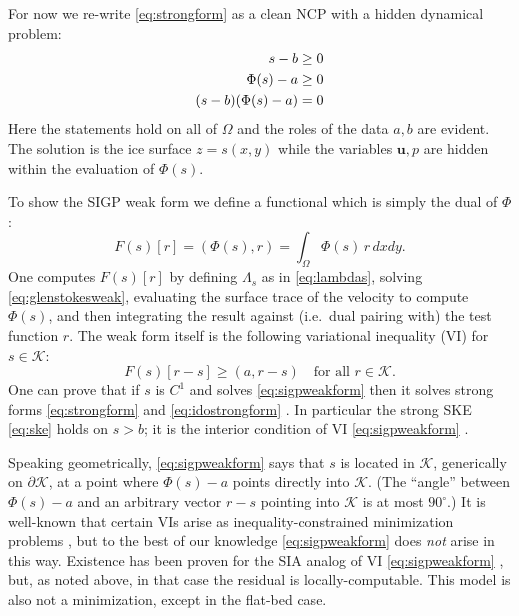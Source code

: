 \documentclass[letterpaper,final,12pt,reqno]{amsart}
\theoremstyle{claim}
\newcommand{\bu}{\mathbf{u}}
\newcommand{\ip}[2]{\left(#1,#2\right)}
\numberwithin{equation}{section}
\numberwithin{figure}{section}
\numberwithin{table}{section}
\numberwithin{theorem}{section}
\begin{document}
For now we re-write \eqref{eq:strongform} as a clean NCP with a hidden dynamical problem:
\begin{align}
s - b &\ge 0  \label{eq:idostrongform} \\
\Phi(s) - a &\ge 0 \notag \\
(s - b) (\Phi(s) - a) &= 0 \notag
\end{align}
Here the statements hold on all of $\Omega$ and the roles of the data $a,b$ are evident.  The solution is the ice surface $z=s(x,y)$ while the variables $\bu,p$ are hidden within the evaluation of $\Phi(s)$.

To show the SIGP weak form we define a functional which is simply the dual of $\Phi$:
\begin{equation}
F(s)[r] = \ip{\Phi(s)}{r} = \int_\Omega \Phi(s)\, r \,dx dy. \label{eq:sigpfunctional}
\end{equation}
One computes $F(s)[r]$ by defining $\Lambda_s$ as in \eqref{eq:lambdas}, solving \eqref{eq:glenstokesweak}, evaluating the surface trace of the velocity to compute $\Phi(s)$, and then integrating the result against (i.e.~dual pairing with) the test function $r$.  The weak form itself is the following variational inequality (VI) \cite{KinderlehrerStampacchia1980} for $s\in\mathcal{K}$:
\begin{equation}
F(s)[r - s] \ge \ip{a}{r-s} \quad \text{for all $r \in \mathcal{K}$.}  \label{eq:sigpweakform}
\end{equation}
One can prove that if $s$ is $C^1$ and solves \eqref{eq:sigpweakform} then it solves strong forms \eqref{eq:strongform} and \eqref{eq:idostrongform} \cite{Bueler2021conservation}.  In particular the strong SKE \eqref{eq:ske} holds on $s>b$; it is the interior condition of VI \eqref{eq:sigpweakform} \cite{KinderlehrerStampacchia1980}.

Speaking geometrically, \eqref{eq:sigpweakform} says that $s$ is located in $\mathcal{K}$, generically on $\partial\mathcal{K}$, at a point where $\Phi(s)-a$ points directly into $\mathcal{K}$.  (The ``angle'' between $\Phi(s)-a$ and an arbitrary vector $r-s$ pointing into $\mathcal{K}$ is at most $90^\circ$.)  It is well-known that certain VIs arise as inequality-constrained minimization problems \cite{GraeserKornhuber2009,KinderlehrerStampacchia1980}, but to the best of our knowledge \eqref{eq:sigpweakform} does \emph{not} arise in this way.  Existence has been proven for the SIA analog of VI \eqref{eq:sigpweakform} \cite{JouvetBueler2012}, but, as noted above, in that case the residual is locally-computable.  This model is also not a minimization, except in the flat-bed case.
\end{document}
